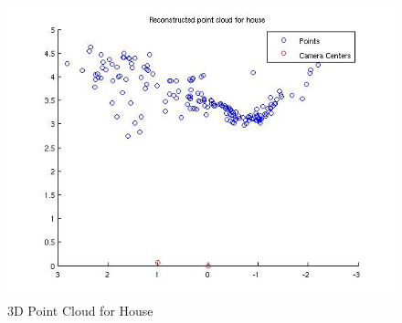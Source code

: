 \documentclass[11pt]{article}
\begin{document}
\begin{figure}[h!]
  \caption{3D Point Cloud for House}
  \label{3d_house}
  \centering
    \includegraphics[width=0.6\linewidth]{../img/house_camera.jpg}
\end{figure}
\end{document}
